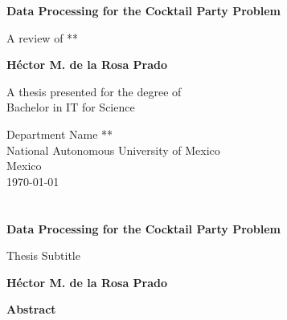 \documentclass{book}
\begin{document}
\newcommand{\titlename}{Data Processing for the Cocktail Party Problem}

\begin{titlepage}
    \begin{center}
        \vspace*{1cm}
 
        \Huge
        \textbf{\titlename}
 
        \vspace{0.5cm}
        \LARGE
        A review of **
 
        \vspace{1.5cm}
 
        \textbf{Héctor M. de la Rosa Prado}
 
        \vfill
 
        A thesis presented for the degree of\\
        Bachelor in IT for Science
 
        \vspace{0.8cm}
 
        
        \Large
        Department Name **\\
        National Autonomous University of Mexico\\
        Mexico\\
        \today\\
 
    \end{center}
\end{titlepage}
\tableofcontents
\newpage
\thispagestyle{plain}

\chapter*{}

\chapter*{}
\begin{center}
    \Large
    \textbf{\titlename}
 
    \vspace{0.4cm}
    \large
    Thesis Subtitle
 
    \vspace{0.4cm}
    \textbf{Héctor M. de la Rosa Prado}
 
    \vspace{0.9cm}
    \textbf{Abstract}
\end{center}
\end{document}
